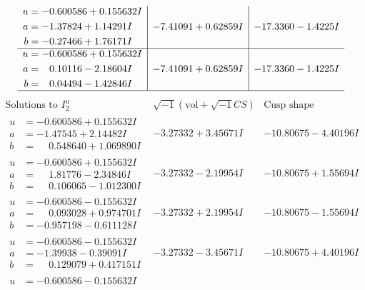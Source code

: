 \documentclass[1p]{elsarticle_modified}
\theoremstyle{definition}
\newcommand{\I}{\sqrt{-1}}
\begin{document}
$$\begin{array}{c|c|c}
\begin{aligned}
u &= -0.600586 + 0.155632 I \\
a &= -1.37824 + 1.14291 I \\
b &= -0.27466 + 1.76171 I\end{aligned}
 & -7.41091 + 0.62859 I & -17.3360 - 1.4225 I \\ \hline\begin{aligned}
u &= -0.600586 + 0.155632 I \\
a &= \phantom{-}0.10116 - 2.18604 I \\
b &= \phantom{-}0.04494 - 1.42846 I\end{aligned}
 & -7.41091 + 0.62859 I & -17.3360 - 1.4225 I\\
 \hline 
 \end{array}$$\newpage$$\begin{array}{c|c|c}  
\text{Solutions to }I^u_{2}& \I (\text{vol} + \sqrt{-1}CS) & \text{Cusp shape}\\
 \hline 
\begin{aligned}
u &= -0.600586 + 0.155632 I \\
a &= -1.47545 + 2.14482 I \\
b &= \phantom{-}0.548640 + 1.069890 I\end{aligned}
 & -3.27332 + 3.45671 I & -10.80675 - 4.40196 I \\ \hline\begin{aligned}
u &= -0.600586 + 0.155632 I \\
a &= \phantom{-}1.81776 - 2.34846 I \\
b &= \phantom{-}0.106065 - 1.012300 I\end{aligned}
 & -3.27332 - 2.19954 I & -10.80675 + 1.55694 I \\ \hline\begin{aligned}
u &= -0.600586 - 0.155632 I \\
a &= \phantom{-}0.093028 + 0.974701 I \\
b &= -0.957198 - 0.611128 I\end{aligned}
 & -3.27332 + 2.19954 I & -10.80675 - 1.55694 I \\ \hline\begin{aligned}
u &= -0.600586 - 0.155632 I \\
a &= -1.39938 - 0.39091 I \\
b &= \phantom{-}0.129079 + 0.417151 I\end{aligned}
 & -3.27332 - 3.45671 I & -10.80675 + 4.40196 I \\ \hline\begin{aligned}
u &= -0.600586 - 0.155632 I \\

\end{aligned}
\end{array}$$
\end{document}
